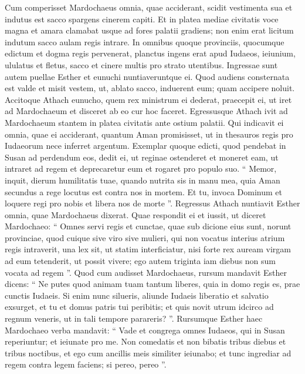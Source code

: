 \begin{biblechapter}
\begin{biblechapter}
\begin{biblechapter}
\begin{biblechapter}
\verse Cum comperisset Mardochaeus omnia, quae acciderant, scidit vestimenta sua et indutus est sacco spargens cinerem capiti. Et in platea mediae civitatis voce magna et amara clamabat 
\verse usque ad fores palatii gradiens; non enim erat licitum indutum sacco aulam regis intrare. 
\verse In omnibus quoque provinciis, quocumque edictum et dogma regis pervenerat, planctus ingens erat apud Iudaeos, ieiunium, ululatus et fletus, sacco et cinere multis pro strato utentibus.
 \verse Ingressae sunt autem puellae Esther et eunuchi nuntiaveruntque ei. Quod audiens consternata est valde et misit vestem, ut, ablato sacco, induerent eum; quam accipere noluit. 
\verse Accitoque Athach eunucho, quem rex ministrum ei dederat, praecepit ei, ut iret ad Mardochaeum et disceret ab eo cur hoc faceret. 
 \verse Egressusque Athach ivit ad Mardochaeum stantem in platea civitatis ante ostium palatii. 
\verse Qui indicavit ei omnia, quae ei acciderant, quantum Aman promisisset, ut in thesauros regis pro Iudaeorum nece inferret argentum. 
\verse Exemplar quoque edicti, quod pendebat in Susan ad perdendum eos, dedit ei, ut reginae ostenderet et moneret eam, ut intraret ad regem et deprecaretur eum et rogaret pro populo suo. \versea “ Memor, inquit, dierum humilitatis tuae, quando nutrita sis in manu mea, quia Aman secundus a rege locutus est contra nos in mortem. Et tu, invoca Dominum et loquere regi pro nobis et libera nos de morte ”. 
\verse Regressus Athach nuntiavit Esther omnia, quae Mardochaeus dixerat. 
 \verse Quae respondit ei et iussit, ut diceret Mardochaeo: 
\verse “ Omnes servi regis et cunctae, quae sub dicione eius sunt, norunt provinciae, quod cuique sive viro sive mulieri, qui non vocatus interius atrium regis intraverit, una lex sit, ut statim interficiatur, nisi forte rex auream virgam ad eum tetenderit, ut possit vivere; ego autem triginta iam diebus non sum vocata ad regem ”. 
\verse Quod cum audisset Mardochaeus, 
\verse rursum mandavit Esther dicens: “ Ne putes quod animam tuam tantum liberes, quia in domo regis es, prae cunctis Iudaeis. 
\verse Si enim nunc silueris, aliunde Iudaeis liberatio et salvatio exsurget, et tu et domus patris tui peribitis; et quis novit utrum idcirco ad regnum veneris, ut in tali tempore parareris? ”.
 \verse Rursumque Esther haec Mardochaeo verba mandavit: 
\verse “ Vade et congrega omnes Iudaeos, qui in Susan reperiuntur; et ieiunate pro me. Non comedatis et non bibatis tribus diebus et tribus noctibus, et ego cum ancillis meis similiter ieiunabo; et tunc ingrediar ad regem contra legem faciens; si pereo, pereo ”. 

\end{biblechapter}
\end{biblechapter}
\end{biblechapter}
\end{biblechapter}
